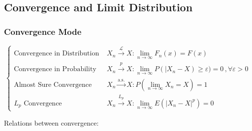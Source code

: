 \subsection{Convergence and Limit Distribution}
\subsubsection{Convergence Mode}
    \begin{equation}
        \begin{cases}
            \text{Convergence in Distribution }&{\displaystyle X_n\xrightarrow[]{\mathscr{L}}X:\lim_{n\to\infty}F_n(x)=F(x)}\\
            \text{Convergence in Probability }&{\displaystyle X_n\xrightarrow[]{p}X:\lim_{n\to\infty}P(|X_n-X)\geq\varepsilon)=0\, ,\forall\varepsilon>0}\\
            \text{Almost Sure Convergence }&{\displaystyle X_n\xrightarrow[]{\text{a.s.}}X:P(\lim_{n\to\infty}X_n=X)=1}\\
            L_p\text{ Convergence }&{\displaystyle X_n\xrightarrow[]{L_p}X:\lim_{n\to\infty}E(|X_n-X|^p)=0}
        \end{cases}
    \end{equation}

        Relations between convergence:
        \begin{center}
        \end{center}

